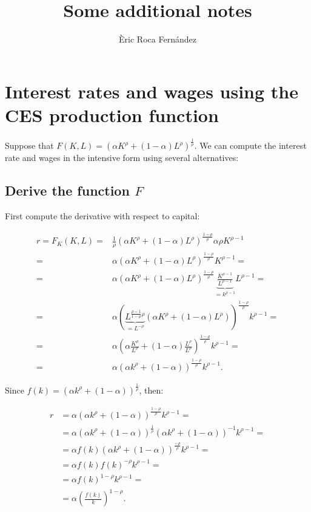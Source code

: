 \documentclass[11pt,a4paper,english]{article}
\title{Some additional notes}
\author[1]{\`{E}ric Roca Fern\'{a}ndez}
\date{}
\newcommand{\sym}[1]{\rlap{#1}}
\begin{document}
\def\sym#1{\ifmmode^{#1}\else\(^{#1}\)\fi}

\maketitle

\section{Interest rates and wages using the CES production function}

Suppose that $F(K,L) = (\alpha K^\rho + (1-\alpha) L^\rho)^\frac{1}{\rho}.$
We can compute the interest rate and wages in the intensive form using several alternatives:

\subsection{Derive the function $F$}

First compute the derivative with respect to capital:

\begin{align*}
    r = F_{K}(K,L) =& \frac{1}{\rho}\left(\alpha K^\rho + (1-\alpha) L^\rho\right)^\frac{1-\rho}{\rho}\alpha \rho K^{\rho-1} \\
    =& \alpha \left( \alpha K^\rho + (1-\alpha)L^\rho \right)^\frac{1-\rho}{\rho} K^{\rho-1} = \\
    =& \alpha \left( \alpha K^\rho + (1-\alpha)L^\rho \right)^\frac{1-\rho}{\rho} \underbrace{\frac{K^{\rho-1}}{L^{\rho-1}}}_{=k^{\rho-1}}L^{\rho-1} = \\
    =& \alpha \left( \underbrace{L^{\frac{\rho-1}{1-\rho}\rho}}_{=L^{-\rho}}(\alpha K^\rho + (1-\alpha)L^\rho) \right)^\frac{1-\rho}{\rho}k^{\rho-1} = \\
    =& \alpha \left( \alpha \frac{K^\rho}{L^\rho} + (1-\alpha)\frac{L^\rho}{L^\rho} \right)^\frac{1-\rho}{\rho}k^{\rho-1} = \\
    =& \alpha \left(\alpha k^\rho + (1-\alpha) \right)^\frac{1-\rho}{\rho}k^{\rho-1}.
\end{align*}

Since $f(k) = \left(\alpha k^\rho + (1-\alpha) \right)^\frac{1}{\rho}$, then:

\begin{align*}
    r &= \alpha \left(\alpha k^\rho + (1-\alpha) \right)^\frac{1-\rho}{\rho}k^{\rho-1} = \\
     &= \alpha \left(\alpha k^\rho + (1-\alpha) \right)^\frac{1}{\rho} \left(\alpha k^\rho + (1-\alpha)\right)^{-1} k^{\rho-1} = \\
     &= \alpha f(k) \left( \alpha k^\rho + (1-\alpha) \right)^\frac{-\rho}{\rho} k^{\rho-1} = \\
     &= \alpha f(k) f(k)^{-\rho} k^{\rho-1} = \\
     &= \alpha f(k)^{1-\rho} k^{\rho-1} = \\
     &= \alpha \left( \frac{f(k)}{k}\right)^{1-\rho}.
\end{align*}
\end{document}
